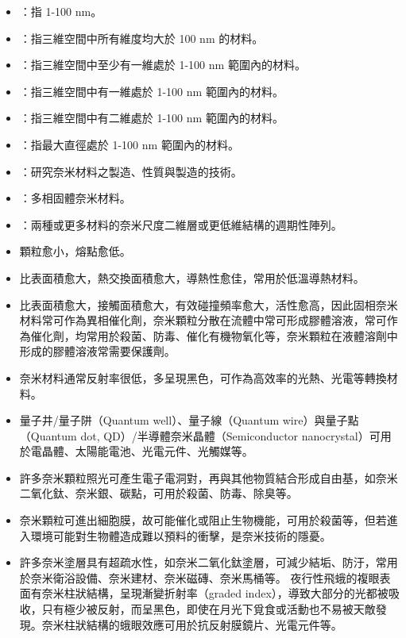 \documentclass[a4paper,12pt]{report}
\begin{document}
\begin{itemize}
\bit
\item {}：指 1-100 nm。
\item {}：指三維空間中所有維度均大於 100 nm 的材料。
\item {}：指三維空間中至少有一維處於 1-100 nm 範圍內的材料。
\item {}：指三維空間中有一維處於 1-100 nm 範圍內的材料。
\item {}：指三維空間中有二維處於 1-100 nm 範圍內的材料。
\item {}：指最大直徑處於 1-100 nm 範圍內的材料。
\item {}：研究奈米材料之製造、性質與製造的技術。 
\item {}：多相固體奈米材料。
\item {}：兩種或更多材料的奈米尺度二維層或更低維結構的週期性陣列。
\eit
{}
\bit
\item 顆粒愈小，熔點愈低。
\item 比表面積愈大，熱交換面積愈大，導熱性愈佳，常用於低溫導熱材料。
\item 比表面積愈大，接觸面積愈大，有效碰撞頻率愈大，活性愈高，因此固相奈米材料常可作為異相催化劑，奈米顆粒分散在流體中常可形成膠體溶液，常可作為催化劑，均常用於殺菌、防毒、催化有機物氧化等，奈米顆粒在液體溶劑中形成的膠體溶液常需要保護劑。
\item 奈米材料通常反射率很低，多呈現黑色，可作為高效率的光熱、光電等轉換材料。
\item 量子井/量子阱（Quantum well）、量子線（Quantum wire）與量子點（Quantum dot, QD）/半導體奈米晶體（Semiconductor nanocrystal）可用於電晶體、太陽能電池、光電元件、光觸媒等。
\item 許多奈米顆粒照光可產生電子電洞對，再與其他物質結合形成自由基，如奈米二氧化鈦、奈米銀、碳點，可用於殺菌、防毒、除臭等。
\item 奈米顆粒可進出細胞膜，故可能催化或阻止生物機能，可用於殺菌等，但若進入環境可能對生物體造成難以預料的衝擊，是奈米技術的隱憂。
\item 許多奈米塗層具有超疏水性，如奈米二氧化鈦塗層，可減少結垢、防汙，常用於奈米衛浴設備、奈米建材、奈米磁磚、奈米馬桶等。
\eit
{}
夜行性飛蛾的複眼表面有奈米柱狀結構，呈現漸變折射率（graded index），導致大部分的光都被吸收，只有極少被反射，而呈黑色，即使在月光下覓食或活動也不易被天敵發現。奈米柱狀結構的蛾眼效應可用於抗反射膜鏡片、光電元件等。

\end{itemize}
\end{document}
